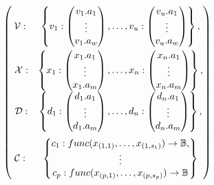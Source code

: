 \hspace{-\marginparwidth}
\hspace{-\marginparsep}
\begin{minipage}{.8\largefigure}
\begin{align}
\begin{pmatrix}\vspace{3pt}
\mathcal{V}:&
	\begin{Bmatrix}
		v_1:
		\begin{pmatrix}
			v_1.a_1\\
			\vdots\\
			v_1.a_w\\
		\end{pmatrix}
		, \ldots,
		v_u:
		\begin{pmatrix}
			v_u.a_1\\
			\vdots\\
			v_u.a_w\\
		\end{pmatrix}
	\end{Bmatrix},\\\hspace{3pt}
	\mathcal{X}:&
	\begin{Bmatrix}
		x_1:
		\begin{pmatrix}
			x_1.a_1\\
			\vdots\\
			x_1.a_m\\
		\end{pmatrix}
		, \ldots,
		x_n:
		\begin{pmatrix}
			x_n.a_1\\
			\vdots\\
			x_n.a_m\\
		\end{pmatrix}
	\end{Bmatrix},\\\hspace{3pt}
	\mathcal{D}:&
	\begin{Bmatrix}
		d_1:
		\begin{pmatrix}
			d_1.a_1\\
			\vdots\\
			d_1.a_m\\
		\end{pmatrix}
		, \ldots,
		d_n:
		\begin{pmatrix}
			d_n.a_1\\
			\vdots\\
			d_n.a_m\\
		\end{pmatrix}
	\end{Bmatrix},\vspace{6pt}\\
	\mathcal{C}:&
	\begin{Bmatrix}
		c_1: func(x_{(1,1)}, \ldots,x_{(1,s_1)}) \rightarrow \mathbb{B},\\
		\vdots\\
		c_p: func(x_{(p,1)}, \ldots,x_{(p,s_p)}) \rightarrow \mathbb{B}
	\end{Bmatrix}
\end{pmatrix}
\label{eq:problem_spec}
\end{align}
\vspace{6pt}
\end{minipage}
